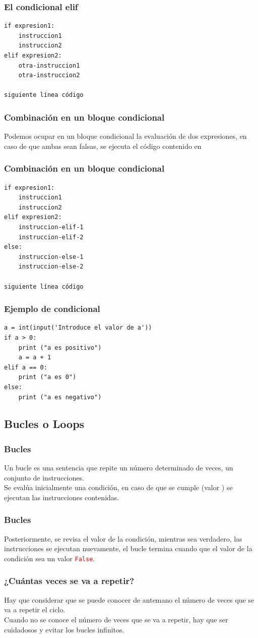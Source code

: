 \begin{frame}[fragile]
\frametitle{El condicional elif}
\begin{verbatim}
if expresion1:
    instruccion1
    instruccion2
elif expresion2:
    otra-instruccion1
    otra-instruccion2

siguiente línea código
\end{verbatim}
\end{frame}
\begin{frame}[fragile]
\frametitle{Combinación en un bloque condicional}
Podemos ocupar en un bloque condicional la evaluación de dos expresiones, en caso de que ambas sean falsas, se ejecuta el código contenido en 
\end{frame}
\begin{frame}[fragile]
\frametitle{Combinación en un bloque condicional}
\fontsize{13}{13}\selectfont
\begin{verbatim}
if expresion1:
    instruccion1
    instruccion2
elif expresion2:
    instruccion-elif-1
    instruccion-elif-2
else:
    instruccion-else-1
    instruccion-else-2

siguiente línea código
\end{verbatim}
\end{frame}
\begin{frame}[fragile]
\frametitle{Ejemplo de condicional}
\begin{lstlisting}
a = int(input('Introduce el valor de a'))
if a > 0:
    print ("a es positivo")
    a = a + 1
elif a == 0: 
    print ("a es 0")
else:
    print ("a es negativo")
\end{lstlisting}
\end{frame}
\subsection{Bucles o Loops}
\begin{frame}
\frametitle{Bucles}
Un bucle es una sentencia que repite un número determinado de veces, un conjunto de instrucciones.
\\
\bigskip
Se evalúa inicialmente una condición, en caso de que se cumple (valor ) se ejecutan las instrucciones contenidas.
\end{frame}
\begin{frame}
\frametitle{Bucles}
Posteriormente, se revisa el valor de la condición, mientras sea verdadero, las instrucciones se ejecutan nuevamente, el bucle termina cuando que el valor de la condición sea un valor \textcolor{red}{\texttt{False}}.
\end{frame}
\begin{frame}
\frametitle{¿Cuántas veces se va a repetir?}
Hay que considerar que se puede conocer de antemano el número de veces que se va a repetir el ciclo.
\\
\bigskip
\pause
Cuando no se conoce el número de veces que se va a repetir, hay que ser cuidadosos y evitar los bucles infinitos.
\end{frame}
